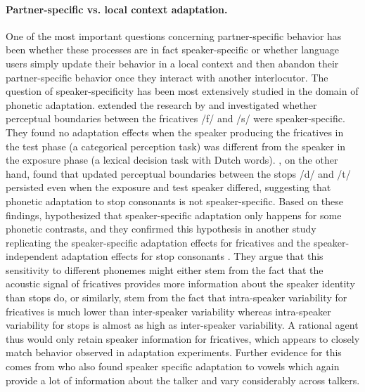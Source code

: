 \paragraph{Partner-specific vs. local context adaptation.} One of the most important questions concerning partner-specific behavior has been whether these processes are in fact
speaker-specific or whether language users simply update their behavior in a local context and then abandon their partner-specific behavior once they interact with another interlocutor.
The question of speaker-specificity has been most extensively studied in the domain of phonetic adaptation. \cite{EisnerMcQueen2005} extended the research by \cite{Norris2003} and
investigated whether perceptual boundaries between the fricatives /f/ and /s/ were speaker-specific. They found no adaptation effects when the speaker producing the fricatives in the 
test phase (a categorical perception task) was different from the speaker in the exposure phase (a lexical decision task with Dutch words). \cite{KraljicSamuel2006}, 
on the other hand, found that updated perceptual boundaries between the stops /d/ and /t/ persisted even when the exposure and test speaker differed, suggesting that phonetic adaptation to stop consonants
is not speaker-specific.  Based on these findings, \cite{KraljicSamuel2006} hypothesized that speaker-specific adaptation only happens for some phonetic contrasts, and they confirmed this hypothesis
in another study replicating the speaker-specific adaptation effects for fricatives and the speaker-independent adaptation effects for stop consonants \cite{KraljicSamuel2007}. They argue that 
this sensitivity to different phonemes might either stem from the fact that the acoustic signal of fricatives provides more information about the speaker identity than stops do, or similarly,
stem from the fact that intra-speaker variability for fricatives is much lower than inter-speaker variability whereas intra-speaker variability for stops is almost as high as inter-speaker variability.
A rational agent thus would only retain speaker information for fricatives, which appears to closely match behavior observed in adaptation experiments. Further evidence for this comes from \cite{TrudeBrownSchmidt2012}
who also found speaker specific adaptation to vowels which again provide a lot of information about the talker and vary considerably across talkers.

